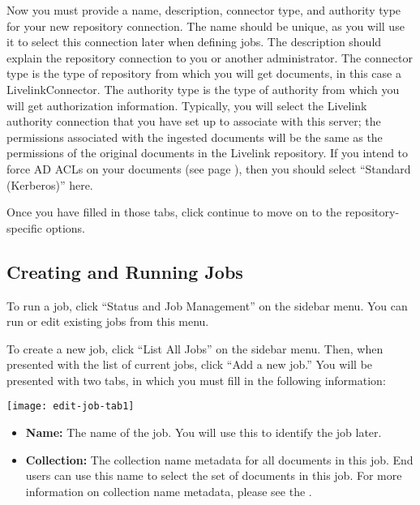 \begin{changemargin}{1.5in}{0in}
Now you must provide a name, description, connector type, and
authority type for your new repository connection. The name should be
unique, as you will use it to select this connection later when
defining jobs. The description should explain the repository
connection to you or another administrator.  The connector type is the
type of repository from which you will get documents, in this case a
LivelinkConnector. The authority type is the type of authority from
which you will get authorization information. Typically, you will
select the Livelink authority connection that you have set up to
associate with this server; the permissions associated with the
ingested documents will be the same as the permissions of the original
documents in the Livelink repository. If you intend to force AD ACLs
on your documents (see page \pageref{ForceACL}), then you should
select ``Standard (Kerberos)'' here.


Once you have filled in those tabs, click continue to move on to the
repository-specific options.



\subsection{Creating and Running Jobs}

To run a job, click ``Status and Job Management'' on the sidebar menu.
You can run or edit existing jobs from this menu.

To create a new job, click ``List All Jobs'' on the sidebar menu. Then, when
presented with the list of current jobs, click ``Add a new job.'' You
will be presented with two tabs, in which you must fill in the following
information:

\texttt{[image: edit-job-tab1]}

\begin{itemize}

\item \textbf{Name:} The name of the job. You will use this to identify
the job later.

\item \textbf{Collection:} The collection name metadata for all documents
in this job. End users can use this
name to select the set of documents in this job. For more information
on collection name metadata, please see the .

\end{itemize}


\end{changemargin}
